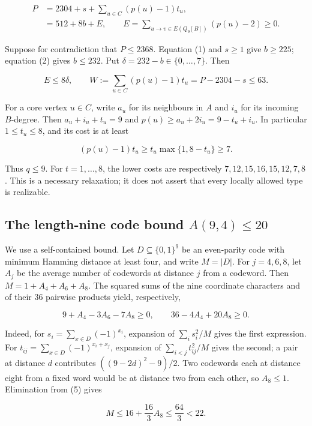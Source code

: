 \documentclass[11pt,a4paper]{article}
\begin{document}
\[
\begin{aligned}
P&=2304+s+\sum_{u\in C}(p(u)-1)t_u,\\
 &=512+8b+E,\qquad
E=\sum_{u\to v\in E(Q_9[B])}(p(u)-2)\ge0.
\end{aligned}\tag{2}
\]

Suppose for contradiction that \(P\le2368\). Equation (1) and \(s\ge1\) give \(b\ge225\); equation (2) gives \(b\le232\). Put \(\delta=232-b\in\{0,\ldots,7\}\). Then

\[
E\le8\delta,\qquad
W:=\sum_{u\in C}(p(u)-1)t_u=P-2304-s\le63.\tag{3}
\]

For a core vertex \(u\in C\), write \(a_u\) for its neighbours in \(A\) and \(i_u\) for its incoming \(B\)-degree. Then \(a_u+i_u+t_u=9\) and \(p(u)\ge a_u+2i_u=9-t_u+i_u\). In particular \(1\le t_u\le8\), and its cost is at least

\[
(p(u)-1)t_u\ge t_u\max\{1,8-t_u\}\ge7.\tag{4}
\]

Thus \(q\le9\). For \(t=1,\ldots,8\), the lower costs are respectively \(7,12,15,16,15,12,7,8\). This is a necessary relaxation; it does not assert that every locally allowed type is realizable.

\subsection{\texorpdfstring{The length-nine code bound \(A(9,4)\le20\)}{The length-nine code bound A(9,4)\textbackslash le20}}\label{the-length-nine-code-bound-a94le20}

We use a self-contained bound. Let \(D\subseteq\{0,1\}^9\) be an even-parity code with minimum Hamming distance at least four, and write \(M=|D|\). For \(j=4,6,8\), let \(A_j\) be the average number of codewords at distance \(j\) from a codeword. Then \(M=1+A_4+A_6+A_8\). The squared sums of the nine coordinate characters and of their 36 pairwise products yield, respectively,

\[
9+A_4-3A_6-7A_8\ge0,\qquad 36-4A_4+20A_8\ge0.\tag{5}
\]

Indeed, for \(s_i=\sum_{x\in D}(-1)^{x_i}\), expansion of \(\sum_i s_i^2/M\) gives the first expression. For \(t_{ij}=\sum_{x\in D}(-1)^{x_i+x_j}\), expansion of \(\sum_{i<j}t_{ij}^2/M\) gives the second; a pair at distance \(d\) contributes \(((9-2d)^2-9)/2\). Two codewords each at distance eight from a fixed word would be at distance two from each other, so \(A_8\le1\). Elimination from (5) gives

\[
M\le16+\frac{16}{3}A_8\le\frac{64}{3}<22.
\]
\end{document}
